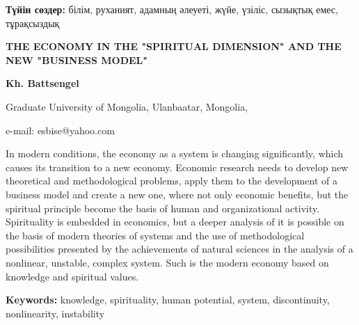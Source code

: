 {\bfseries Түйін сөздер:} білім, руханият, адамның әлеуеті, жүйе, үзіліс,
сызықтық емес, тұрақсыздық

\begin{center}
{\large\bfseries THE ECONOMY IN THE "SPIRITUAL DIMENSION" AND THE NEW "BUSINESS MODEL"}

{\bfseries Kh. Battsengel}

Graduate University of Mongolia, Ulanbaatar, Mongolia,

e-mail: esbise@yahoo.com
\end{center}

In modern conditions, the economy as a system is changing significantly,
which causes its transition to a new economy. Economic research needs to
develop new theoretical and methodological problems, apply them to the
development of a business model and create a new one, where not only
economic benefits, but the spiritual principle become the basis of human
and organizational activity. Spirituality is embedded in economics, but
a deeper analysis of it is possible on the basis of modern theories of
systems and the use of methodological possibilities presented by the
achievements of natural sciences in the analysis of a nonlinear,
unstable, complex system. Such is the modern economy based on knowledge
and spiritual values.

{\bfseries Keywords:} knowledge, spirituality, human potential, system,
discontinuity, nonlinearity, instability

